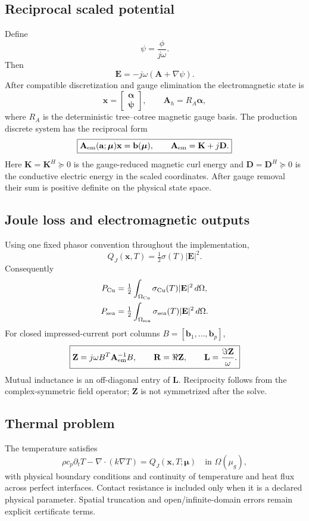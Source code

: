 \documentclass[11pt]{article}
\theoremstyle{remark}
\newcommand{\aT}{\mathbf a}
\newcommand{\mupar}{\boldsymbol\mu}
\begin{document}
\subsection{Reciprocal scaled potential}
Define
\[
\psi=\frac{\phi}{j\omega}.
\]
Then
\[
\mathbf E=-j\omega(\mathbf A+\nabla\psi).
\]
After compatible discretization and gauge elimination the electromagnetic state is
\[
\mathbf x=\begin{bmatrix}\boldsymbol\alpha\\\boldsymbol\psi\end{bmatrix},
\qquad
\mathbf A_h=R_A\boldsymbol\alpha,
\]
where \(R_A\) is the deterministic tree--cotree magnetic gauge basis. The production discrete system has the reciprocal form
\begin{equation}
\boxed{
\mathbf A_{\rm em}(\aT;\mupar)\mathbf x=\mathbf b(\mupar),
\qquad
\mathbf A_{\rm em}=\mathbf K+j\mathbf D.
}
\label{eq:apsi_system}
\end{equation}
Here \(\mathbf K=\mathbf K^H\succeq0\) is the gauge-reduced magnetic curl energy and \(\mathbf D=\mathbf D^H\succeq0\) is the conductive electric energy in the scaled coordinates. After gauge removal their sum is positive definite on the physical state space.

\subsection{Joule loss and electromagnetic outputs}
Using one fixed phasor convention throughout the implementation,
\[
Q_J(\mathbf x,T)=\tfrac12\sigma(T)|\mathbf E|^2.
\]
Consequently
\begin{align}
P_{\rm Cu}&=\tfrac12\int_{\Omega_{\rm Cu}}\sigma_{\rm Cu}(T)|\mathbf E|^2\,d\Omega,\\
P_{\rm sea}&=\tfrac12\int_{\Omega_{\rm sea}}\sigma_{\rm sea}(T)|\mathbf E|^2\,d\Omega.
\end{align}
For closed impressed-current port columns \(B=[\mathbf b_1,\ldots,\mathbf b_p]\),
\begin{equation}
\boxed{
\mathbf Z=j\omega B^T\mathbf A_{\rm em}^{-1}B,
\qquad
\mathbf R=\Re\mathbf Z,
\qquad
\mathbf L=\frac{\Im\mathbf Z}{\omega}.
}
\label{eq:multiport_z}
\end{equation}
Mutual inductance is an off-diagonal entry of \(\mathbf L\). Reciprocity follows from the complex-symmetric field operator; \(\mathbf Z\) is not symmetrized after the solve.

\subsection{Thermal problem}
The temperature satisfies
\begin{equation}
\rho c_p\partial_tT-\nabla\cdot(k\nabla T)
=Q_J(\mathbf x,T;\mupar)
\quad\text{in }\Omega(\mu_g),
\label{eq:heat_full}
\end{equation}
with physical boundary conditions and continuity of temperature and heat flux across perfect interfaces. Contact resistance is included only when it is a declared physical parameter. Spatial truncation and open/infinite-domain errors remain explicit certificate terms.
\end{document}
